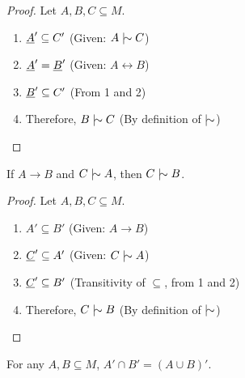 \documentclass[11pt]{article}
\begin{document}
\begin{proof}
  Let $A, B, C \subseteq M$.
  \begin{enumerate}
    \item $\underline{A}' \subseteq C'$ \hfill (Given: $A \twiddle C$)
    \item $\underline{A}' = \underline{B}'$ \hfill (Given: $A \leftrightarrow B$)
    \item $\underline{B}' \subseteq C'$ \hfill (From 1 and 2)
    \item Therefore, $B \twiddle C$ \hfill (By definition of $\twiddle$)
  \end{enumerate}
\end{proof}

\begin{theorem}
  If $A \rightarrow B$ and $C \twiddle A$, then $C \twiddle B$.
\end{theorem}

\begin{proof}
  Let $A, B, C \subseteq M$.
  \begin{enumerate}
    \item $A' \subseteq B'$ \hfill (Given: $A \rightarrow B$)
    \item $\underline{C}' \subseteq A'$ \hfill (Given: $C \twiddle A$)
    \item $\underline{C}' \subseteq B'$ \hfill (Transitivity of $\subseteq$, from 1 and 2)
    \item Therefore, $C \twiddle B$ \hfill (By definition of $\twiddle$)
  \end{enumerate}
\end{proof}
\clearpage
\begin{lemma}
  For any $A, B \subseteq M$, $A' \cap B' = (A \cup B)'$.
\end{lemma}
\end{document}
